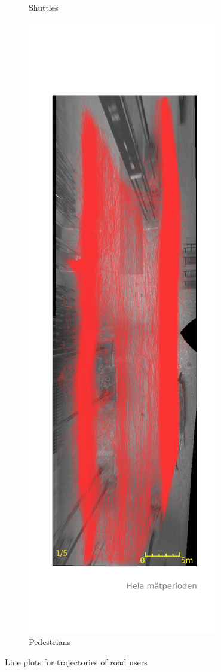 \documentclass{article}
\begin{document}
\begin{figure}[H]
\begin{subfigure}{.3\textwidth}
  \caption{Shuttles}
  \label{fig:shu_tra}
\end{subfigure}
\begin{subfigure}{.3\textwidth}
  \centering
  \includegraphics[width=\linewidth]{data/Data_4.png}
  \caption{Pedestrians}
  \label{fig:ped_shu}
\end{subfigure}
\caption{Line plots for trajectories of road users}
\label{fig:trajectories}
\end{figure}
\end{document}
